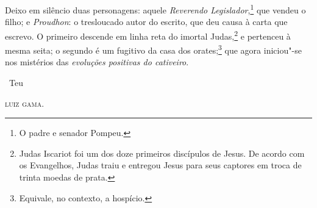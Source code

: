 \asterisc

Deixo em silêncio duas personagens: aquele \emph{Reverendo
Legislador},\footnote{O padre e senador Pompeu.} que vendeu o filho; e
\emph{Proudhon}: o tresloucado autor do escrito, que deu causa à carta
que escrevo. O primeiro descende em linha reta do imortal
Judas,\footnote{Judas Iscariot foi um dos doze primeiros discípulos de
  Jesus. De acordo com os Evangelhos, Judas traiu e entregou Jesus para
  seus captores em troca de trinta moedas de prata.} e pertenceu à
mesma seita; o segundo é um fugitivo da casa dos orates;\footnote{
  Equivale, no contexto, a hospício.} que agora iniciou"-se nos
mistérios das \emph{evoluções positivas do cativeiro}.


\hfill\ Teu

\hfill\textsc{luiz gama.}

\paginabranca
\mbox{}\vfill
\thispagestyle{empty}

